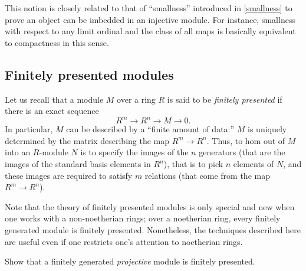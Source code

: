 This notion is closely related to that of ``smallness'' introduced in
\cref{smallness} to prove an object can be imbedded in an injective module.
For instance, smallness with respect to any limit ordinal and the class of all
maps is basically equivalent to compactness in this sense.




\subsection{Finitely presented modules}


Let us recall that a module $M$ over a ring $R$ is said to be \emph{finitely
presented} if there is an exact sequence
\[ R^m \to R^n \to M \to 0.  \]
In particular, $M$ can be described by a ``finite amount of data:'' $M$ is
uniquely determined by the matrix describing the map $R^m \to R^n$. 
Thus, to hom out of $M$  into an $R$-module $N$ is to specify the images of the $n$ generators 
(that are the images of the standard basis elements in $R^n$), that is to
pick $n$ elements of $N$, and these
images are required to satisfy $m$ relations (that come from the map $R^m \to
R^n$).


Note that the theory of finitely presented modules is only special and new
when one works with a non-noetherian rings; over a noetherian ring, every
finitely generated module is finitely presented. Nonetheless, the techniques
described here are useful even if one restricts one's attention to noetherian
rings.

\begin{exercise} 
Show that a finitely generated \emph{projective} module is finitely presented.
\end{exercise} 


